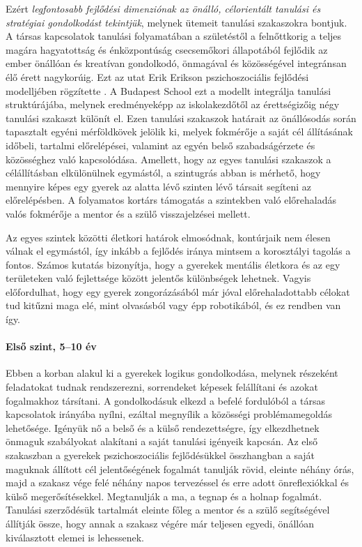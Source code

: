 Ezért \emph{legfontosabb fejlődési dimenziónak az önálló, célorientált tanulási és stratégiai gondolkodást tekintjük}, melynek ütemeit tanulási szakaszokra bontjuk. A társas kapcsolatok tanulási folyamatában a születéstől a felnőttkorig a teljes magára hagyatottság és énközpontúság csecsemőkori állapotából fejlődik az ember önállóan és kreatívan gondolkodó, önmagával és közösségével integránsan élő érett nagykorúig. Ezt az utat Erik Erikson pszichoszociális fejlődési modelljében rögzítette \citep{Erikson91}. A Budapest School ezt a modellt integrálja tanulási struktúrájába, melynek eredményeképp az iskolakezdőtől az érettségizőig négy tanulási szakaszt különít el. Ezen tanulási szakaszok határait az önállósodás során tapasztalt egyéni mérföldkövek jelölik ki, melyek fokmérője a saját cél állításának időbeli, tartalmi előrelépései, valamint az egyén belső szabadságérzete és közösséghez való kapcsolódása. Amellett, hogy az egyes tanulási szakaszok  a célállításban elkülönülnek egymástól, a szintugrás abban is mérhető, hogy mennyire képes egy gyerek az alatta lévő szinten lévő társait segíteni az előrelépésben. A folyamatos kortárs támogatás a szintekben való előrehaladás valós fokmérője a mentor és a szülő visszajelzései mellett.

Az egyes szintek közötti életkori határok elmosódnak, kontúrjaik nem élesen válnak el egymástól, így inkább a fejlődés iránya mintsem a korosztályi tagolás a fontos. Számos kutatás bizonyítja, hogy a gyerekek mentális életkora és az egy területeken való fejlettsége között jelentős különbségek lehetnek. Vagyis előfordulhat, hogy egy gyerek zongorázásából már jóval előrehaladottabb célokat tud kitűzni maga elé, mint olvasásból vagy épp robotikából, és ez rendben van így. 

\paragraph{Első szint, 5--10 év }

Ebben a korban alakul ki a gyerekek logikus gondolkodása, melynek részeként feladatokat tudnak rendszerezni, sorrendeket képesek felállítani és azokat fogalmakhoz társítani. A gondolkodásuk elkezd a befelé fordulóból a társas kapcsolatok irányába nyílni, ezáltal megnyílik a közösségi problémamegoldás lehetősége. Igényük nő a belső és a külső rendezettségre, így elkezdhetnek önmaguk szabályokat alakítani a saját tanulási igényeik kapcsán. Az első szakaszban a gyerekek pszichoszociális fejlődésükkel összhangban a saját maguknak állított cél jelentőségének fogalmát tanulják rövid, eleinte néhány órás, majd a szakasz vége felé néhány napos tervezéssel és erre adott önreflexiókkal és külső megerősítésekkel.  Megtanulják a ma, a tegnap és a holnap fogalmát. Tanulási szerződésük tartalmát eleinte főleg a mentor és a szülő segítségével állítják össze, hogy annak a szakasz végére már teljesen egyedi, önállóan kiválasztott elemei is lehessenek.

